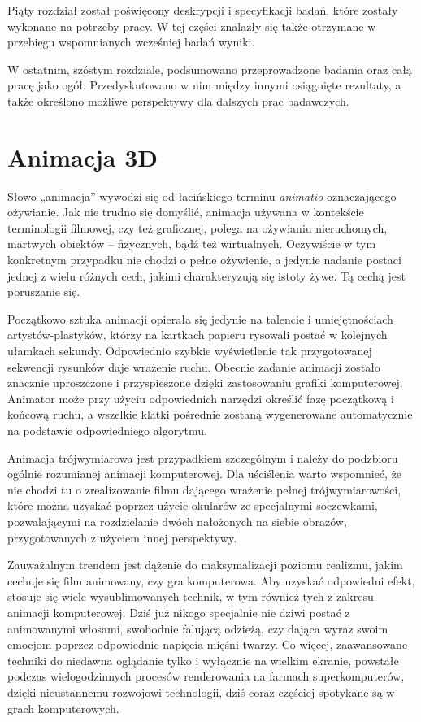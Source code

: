\documentclass[11pt]{mwrep}
\begin{document}
  Piąty rozdział został poświęcony deskrypcji i specyfikacji badań, które zostały wykonane na potrzeby pracy. W tej części znalazły się także otrzymane w przebiegu wspomnianych wcześniej badań wyniki.

  W ostatnim, szóstym rozdziale, podsumowano przeprowadzone badania oraz całą pracę jako ogół. Przedyskutowano w nim między innymi osiągnięte rezultaty, a także określono możliwe perspektywy dla dalszych prac badawczych.


\chapter{Animacja 3D}

Słowo „animacja” wywodzi się od łacińskiego terminu \textit{animatio} oznaczającego ożywianie. Jak nie trudno się domyślić, animacja używana w kontekście terminologii filmowej, czy też graficznej, polega na ożywianiu nieruchomych, martwych obiektów -- fizycznych, bądź też wirtualnych. Oczywiście w tym konkretnym przypadku nie chodzi o pełne ożywienie, a jedynie nadanie postaci jednej z wielu różnych cech, jakimi charakteryzują się istoty żywe. Tą cechą jest poruszanie się.

Początkowo sztuka animacji opierała się jedynie na talencie i umiejętnościach ar\-tys\-tów-plas\-tyk\-ów, którzy na kartkach papieru rysowali postać w kolejnych ułamkach sekundy. Odpowiednio szybkie wyświetlenie tak przygotowanej sekwencji rysunków daje wrażenie ruchu. Obecnie zadanie animacji zostało znacznie uproszczone i przyspieszone dzięki zastosowaniu grafiki komputerowej. Animator może przy użyciu odpowiednich narzędzi określić fazę początkową i końcową ruchu, a wszelkie klatki pośrednie zostaną wygenerowane automatycznie na podstawie odpowiedniego algorytmu.

Animacja trójwymiarowa jest przypadkiem szczególnym i należy do podzbioru ogólnie rozumianej animacji komputerowej. Dla uściślenia warto wspomnieć, że nie chodzi tu o zrealizowanie filmu dającego wrażenie pełnej trójwymiarowości, które można uzyskać poprzez użycie okularów ze specjalnymi soczewkami, pozwalającymi na rozdzielanie dwóch nałożonych na siebie obrazów, przygotowanych z użyciem innej perspektywy.

Zauważalnym trendem jest dążenie do maksymalizacji poziomu realizmu, jakim cechuje się film animowany, czy gra komputerowa. Aby uzyskać odpowiedni efekt, stosuje się wiele wysublimowanych technik, w tym również tych z zakresu animacji komputerowej. Dziś już nikogo specjalnie nie dziwi postać z animowanymi włosami, swobodnie falującą odzieżą, czy dająca wyraz swoim emocjom poprzez odpowiednie napięcia mięśni twarzy. Co więcej, zaawansowane techniki do niedawna oglądanie tylko i wyłącznie na wielkim ekranie, powstałe podczas wielogodzinnych procesów renderowania na farmach superkomputerów, dzięki nieustannemu rozwojowi technologii, dziś coraz częściej spotykane są w grach komputerowych.
\end{document}
